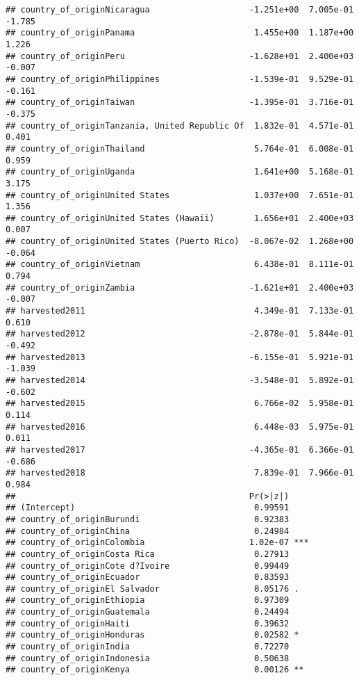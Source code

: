 \documentclass[
]{article}
\begin{document}
\begin{verbatim}
## country_of_originNicaragua                    -1.251e+00  7.005e-01  -1.785
## country_of_originPanama                        1.455e+00  1.187e+00   1.226
## country_of_originPeru                         -1.628e+01  2.400e+03  -0.007
## country_of_originPhilippines                  -1.539e-01  9.529e-01  -0.161
## country_of_originTaiwan                       -1.395e-01  3.716e-01  -0.375
## country_of_originTanzania, United Republic Of  1.832e-01  4.571e-01   0.401
## country_of_originThailand                      5.764e-01  6.008e-01   0.959
## country_of_originUganda                        1.641e+00  5.168e-01   3.175
## country_of_originUnited States                 1.037e+00  7.651e-01   1.356
## country_of_originUnited States (Hawaii)        1.656e+01  2.400e+03   0.007
## country_of_originUnited States (Puerto Rico)  -8.067e-02  1.268e+00  -0.064
## country_of_originVietnam                       6.438e-01  8.111e-01   0.794
## country_of_originZambia                       -1.621e+01  2.400e+03  -0.007
## harvested2011                                  4.349e-01  7.133e-01   0.610
## harvested2012                                 -2.878e-01  5.844e-01  -0.492
## harvested2013                                 -6.155e-01  5.921e-01  -1.039
## harvested2014                                 -3.548e-01  5.892e-01  -0.602
## harvested2015                                  6.766e-02  5.958e-01   0.114
## harvested2016                                  6.448e-03  5.975e-01   0.011
## harvested2017                                 -4.365e-01  6.366e-01  -0.686
## harvested2018                                  7.839e-01  7.966e-01   0.984
##                                               Pr(>|z|)    
## (Intercept)                                    0.99591    
## country_of_originBurundi                       0.92383    
## country_of_originChina                         0.24984    
## country_of_originColombia                     1.02e-07 ***
## country_of_originCosta Rica                    0.27913    
## country_of_originCote d?Ivoire                 0.99449    
## country_of_originEcuador                       0.83593    
## country_of_originEl Salvador                   0.05176 .  
## country_of_originEthiopia                      0.97309    
## country_of_originGuatemala                     0.24494    
## country_of_originHaiti                         0.39632    
## country_of_originHonduras                      0.02582 *  
## country_of_originIndia                         0.72270    
## country_of_originIndonesia                     0.50638    
## country_of_originKenya                         0.00126 ** 

\end{verbatim}
\end{document}
